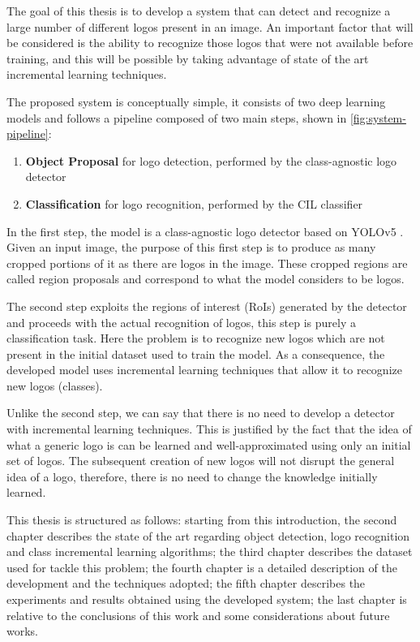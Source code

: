 The goal of this thesis is to develop a system that can detect and recognize 
a large number of different logos present in an image. An important factor that will be considered is the ability to recognize those logos that were not available before training, and this will be possible by taking advantage of state of the art incremental learning techniques.

The proposed system is conceptually simple, it consists of two deep learning models and follows a pipeline composed of two main steps, shown in \autoref{fig:system-pipeline}:

\begin{enumerate}
    \item \textbf{Object Proposal} for logo detection, performed by the class-agnostic logo detector
    \item \textbf{Classification} for logo recognition, performed by the CIL classifier
\end{enumerate}

In the first step, the model is a class-agnostic logo detector based on YOLOv5 \cite{glenn_jocher_2021_5563715}. Given an input image, the purpose of this first step is to produce as many cropped portions of it as there are logos in the image. These cropped regions are called region proposals and correspond to what the model considers to be logos.

The second step exploits the regions of interest (RoIs) generated by the detector and proceeds with the actual recognition of logos, this step is purely a classification task. Here the problem is to recognize new logos which are not present in the initial dataset used to train the model. As a consequence, the developed model uses incremental learning techniques that allow it to recognize new logos (classes).

Unlike the second step, we can say that there is no need to develop a detector with incremental learning techniques. This is justified by the fact that the idea of what a generic logo is can be learned and well-approximated using only an initial set of logos. The subsequent creation of new logos will not disrupt the general idea of a logo, therefore, there is no need to change the knowledge initially learned.

\vspace{1.5\baselineskip}
This thesis is structured as follows: starting from this introduction, the second chapter describes the state of the art regarding object detection, logo recognition and class incremental learning algorithms; the third chapter describes the dataset used for tackle this problem; the fourth chapter is a detailed description of the development and the techniques adopted; the fifth chapter describes the experiments and results obtained using the developed system; the last chapter is relative to the conclusions of this work and some considerations about future works.